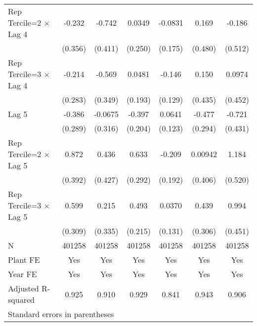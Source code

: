 \begin{table}[htbp]
\begin{tabular}{l*{6}{c}}
\addlinespace
Rep Tercile=2 $\times$ Lag 4&   -0.232         &   -0.742         &   0.0349         &  -0.0831         &    0.169         &   -0.186         \\
                &  (0.356)         &  (0.411)         &  (0.250)         &  (0.175)         &  (0.480)         &  (0.512)         \\
\addlinespace
Rep Tercile=3 $\times$ Lag 4&   -0.214         &   -0.569         &   0.0481         &   -0.146         &    0.150         &   0.0974         \\
                &  (0.283)         &  (0.349)         &  (0.193)         &  (0.129)         &  (0.435)         &  (0.452)         \\
\addlinespace
Lag 5           &   -0.386         &  -0.0675         &   -0.397         &   0.0641         &   -0.477         &   -0.721         \\
                &  (0.289)         &  (0.316)         &  (0.204)         &  (0.123)         &  (0.294)         &  (0.431)         \\
\addlinespace
Rep Tercile=2 $\times$ Lag 5&    0.872\sym{*}  &    0.436         &    0.633\sym{*}  &   -0.209         &  0.00942         &    1.184\sym{*}  \\
                &  (0.392)         &  (0.427)         &  (0.292)         &  (0.192)         &  (0.406)         &  (0.520)         \\
\addlinespace
Rep Tercile=3 $\times$ Lag 5&    0.599         &    0.215         &    0.493\sym{*}  &   0.0370         &    0.439         &    0.994\sym{*}  \\
                &  (0.309)         &  (0.335)         &  (0.215)         &  (0.131)         &  (0.306)         &  (0.451)         \\
\midrule
N               &   401258         &   401258         &   401258         &   401258         &   401258         &   401258         \\
Plant FE        &      Yes         &      Yes         &      Yes         &      Yes         &      Yes         &      Yes         \\
Year FE         &      Yes         &      Yes         &      Yes         &      Yes         &      Yes         &      Yes         \\
Adjusted R-squared&    0.925         &    0.910         &    0.929         &    0.841         &    0.943         &    0.906         \\
\bottomrule
\multicolumn{7}{l}{\footnotesize Standard errors in parentheses}\\

\end{tabular}
\end{table}
